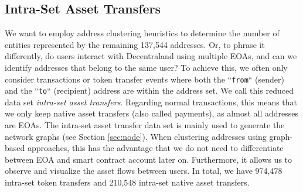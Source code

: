\documentclass[12pt,a4paper,titlepage,oneside,english]{article}
\begin{document}
\subsection{Intra-Set Asset Transfers}
\label{sec:intra-set}
We want to employ address clustering heuristics to determine the number of entities represented by the remaining 137,544 addresses. Or, to phrase it differently, do users interact with Decentraland using multiple EOAs, and can we identify addresses that belong to the same user?
\newline
To achieve this, we often only consider transactions or token transfer events where both the ``\texttt{from}`` (sender) and the ``\texttt{to}`` (recipient) address are within the address set. We call this reduced data set \textit{intra-set asset transfers}. Regarding normal transactions, this means that we only keep native asset transfers (also called payments), as almost all addresses are EOAs. \newline
The intra-set asset transfer data set is mainly used to generate the network graphs (see Section \ref{sec:node}).
When clustering addresses using graph-based approaches, this has the advantage that we do not need to differentiate between EOA and smart contract account later on. Furthermore, it allows us to observe and visualize the asset flows between users. In total, we have 974,478 intra-set token transfers and 210,548 intra-set native asset transfers.  %
\end{document}
